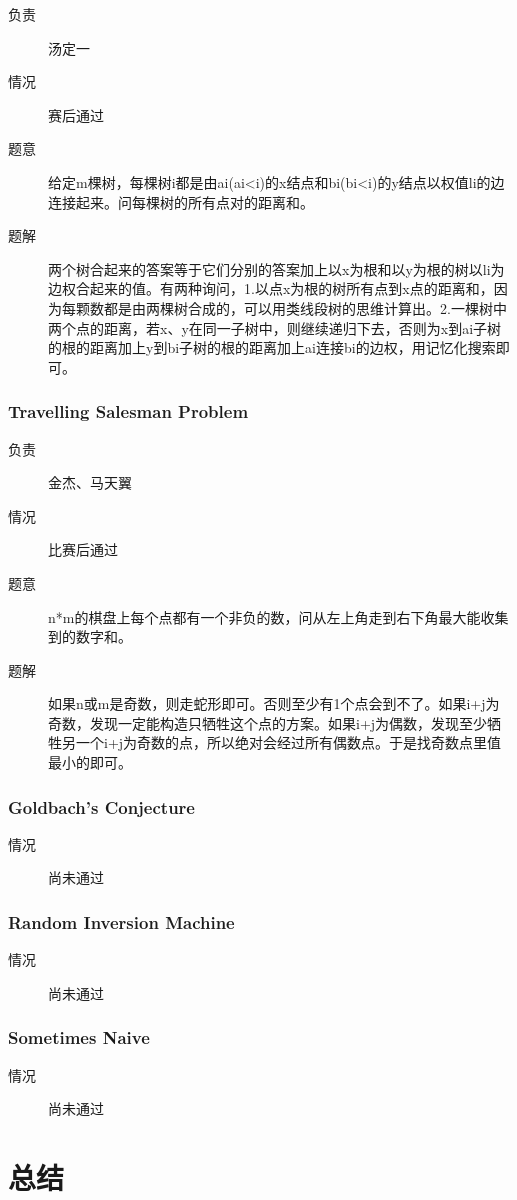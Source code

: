 \documentclass[a4paper, 11pt, nofonts, nocap, fancyhdr]{ctexart}
\newcommand{\problem}[1]{\subsubsection{#1}}
\begin{document}
\begin{description}
\item[负责] 汤定一
\item[情况] 赛后通过
\item[题意]
给定m棵树，每棵树i都是由ai(ai<i)的x结点和bi(bi<i)的y结点以权值li的边连接起来。问每棵树的所有点对的距离和。
\item[题解]
两个树合起来的答案等于它们分别的答案加上以x为根和以y为根的树以li为边权合起来的值。有两种询问，1.以点x为根的树所有点到x点的距离和，因为每颗数都是由两棵树合成的，可以用类线段树的思维计算出。2.一棵树中两个点的距离，若x、y在同一子树中，则继续递归下去，否则为x到ai子树的根的距离加上y到bi子树的根的距离加上ai连接bi的边权，用记忆化搜索即可。
\end{description}

\problem{Travelling Salesman Problem}

\begin{description}
\item[负责] 金杰、马天翼
\item[情况] 比赛后通过
\item[题意]
n*m的棋盘上每个点都有一个非负的数，问从左上角走到右下角最大能收集到的数字和。
\item[题解]
如果n或m是奇数，则走蛇形即可。否则至少有1个点会到不了。如果i+j为奇数，发现一定能构造只牺牲这个点的方案。如果i+j为偶数，发现至少牺牲另一个i+j为奇数的点，所以绝对会经过所有偶数点。于是找奇数点里值最小的即可。
\end{description}

\problem{Goldbach's Conjecture}

\begin{description}
\item[情况] 尚未通过
\end{description}

\problem{Random Inversion Machine}

\begin{description}
\item[情况] 尚未通过
\end{description}

\problem{Sometimes Naive}

\begin{description}
\item[情况] 尚未通过
\end{description}

\section{总结}
\end{document}
